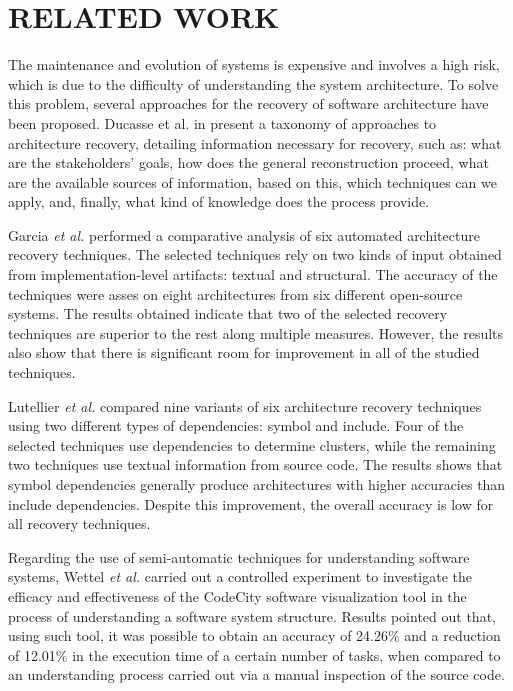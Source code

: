 \section{RELATED WORK}\label{sec:related}

The maintenance and evolution of systems is expensive and involves a high risk, which is due to the difficulty of understanding the system architecture. To solve this problem, several approaches for the recovery of software architecture have been proposed. Ducasse et al. in \cite{ducasse_software_2009} present a taxonomy of approaches to architecture recovery, detailing information necessary for recovery, such as: what are the stakeholders’ goals, how does the general reconstruction proceed, what are the available sources of information, based on this, which techniques can we apply, and, finally, what kind of knowledge does the process provide.

Garcia \textit{et al.} \cite{Garcia:ASE2013} performed a comparative analysis of six automated architecture recovery techniques. The selected techniques rely on two kinds of input obtained from implementation-level artifacts: textual and structural. The accuracy of the techniques were asses on eight architectures from six different open-source systems. The results obtained indicate that two of the selected recovery techniques are superior to the rest along multiple measures. However, the results also show that there is significant room for improvement in all of the studied techniques.

Lutellier \textit{et al.} \cite{Lutellier_2015} compared nine variants of six architecture recovery techniques using two different types of dependencies: symbol and include. Four of the selected techniques use dependencies to determine clusters, while the remaining two techniques use textual information from source code. The results shows that symbol dependencies generally produce architectures with higher accuracies than include dependencies. Despite this improvement, the overall accuracy is low for all recovery techniques.

Regarding the use of semi-automatic techniques for understanding software systems, Wettel \textit{et al.} \cite{wettel_software_2011} carried out a controlled experiment to investigate the efficacy and effectiveness of the CodeCity software visualization tool in the process of understanding a software system structure. Results pointed out that, using such tool, it was possible to obtain an accuracy of 24.26\% and a reduction of 12.01\% in the execution time of a certain number of tasks, when compared to an understanding process carried out via a manual inspection of the source code.